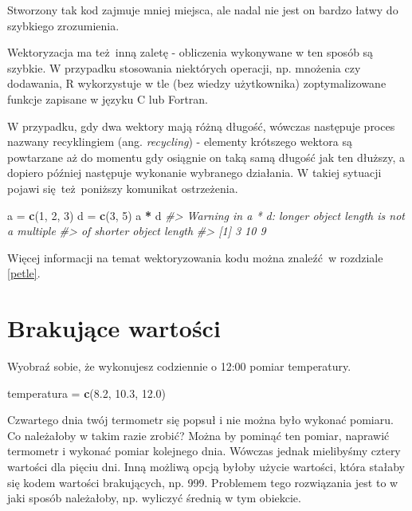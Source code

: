 \documentclass[paper=6in:9in,pagesize=pdftex,headinclude=on,footinclude=on,10pt]{scrbook}
\newenvironment{Shaded}{\begin{snugshade}}{\end{snugshade}}
\newcommand{\CommentTok}[1]{\textcolor[rgb]{0.56,0.35,0.01}{\textit{#1}}}
\newcommand{\DecValTok}[1]{\textcolor[rgb]{0.00,0.00,0.81}{#1}}
\newcommand{\FloatTok}[1]{\textcolor[rgb]{0.00,0.00,0.81}{#1}}
\newcommand{\KeywordTok}[1]{\textcolor[rgb]{0.13,0.29,0.53}{\textbf{#1}}}
\newcommand{\NormalTok}[1]{#1}
\newcommand{\OperatorTok}[1]{\textcolor[rgb]{0.81,0.36,0.00}{\textbf{#1}}}
\newcommand{\StringTok}[1]{\textcolor[rgb]{0.31,0.60,0.02}{#1}}
\begin{document}
Stworzony tak kod zajmuje mniej miejsca, ale nadal nie jest on bardzo łatwy do szybkiego zrozumienia.

Wektoryzacja ma też~inną zaletę - obliczenia wykonywane w ten sposób są szybkie.
W przypadku stosowania niektórych operacji, np. mnożenia czy dodawania, R wykorzystuje w tle (bez wiedzy użytkownika) zoptymalizowane funkcje zapisane w języku C lub Fortran.

W przypadku, gdy dwa wektory mają różną długość, wówczas następuje proces nazwany recyklingiem (ang. \emph{recycling}) - elementy krótszego wektora są powtarzane aż do momentu gdy osiągnie on taką samą długość jak ten dłuższy, a dopiero później następuje wykonanie wybranego działania.
W takiej sytuacji pojawi się~też~poniższy komunikat ostrzeżenia.

\begin{Shaded}
\begin{Highlighting}[]
\NormalTok{a =}\StringTok{ }\KeywordTok{c}\NormalTok{(}\DecValTok{1}\NormalTok{, }\DecValTok{2}\NormalTok{, }\DecValTok{3}\NormalTok{)}
\NormalTok{d =}\StringTok{ }\KeywordTok{c}\NormalTok{(}\DecValTok{3}\NormalTok{, }\DecValTok{5}\NormalTok{)}
\NormalTok{a }\OperatorTok{*}\StringTok{ }\NormalTok{d}
\CommentTok{#> Warning in a * d: longer object length is not a multiple}
\CommentTok{#> of shorter object length}
\CommentTok{#> [1]  3 10  9}
\end{Highlighting}
\end{Shaded}

Więcej informacji na temat wektoryzowania kodu można znaleźć~w rozdziale \ref{petle}.

\hypertarget{na}{%
\section{Brakujące wartości}\label{na}}

Wyobraź sobie, że wykonujesz codziennie o 12:00 pomiar temperatury.

\begin{Shaded}
\begin{Highlighting}[]
\NormalTok{temperatura =}\StringTok{ }\KeywordTok{c}\NormalTok{(}\FloatTok{8.2}\NormalTok{, }\FloatTok{10.3}\NormalTok{, }\FloatTok{12.0}\NormalTok{)}
\end{Highlighting}
\end{Shaded}

Czwartego dnia twój termometr się popsuł i nie można było wykonać pomiaru.
Co należałoby w takim razie zrobić?
Można by pominąć ten pomiar, naprawić termometr i wykonać pomiar kolejnego dnia.
Wówczas jednak mielibyśmy cztery wartości dla pięciu dni.
Inną możliwą opcją byłoby użycie wartości, która stałaby się kodem wartości brakujących, np. 999.
Problemem tego rozwiązania jest to w jaki sposób należałoby, np. wyliczyć średnią w tym obiekcie.
\end{document}
